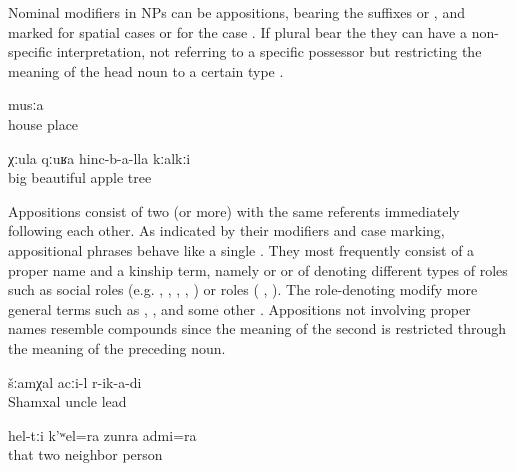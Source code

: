 Nominal modifiers in NPs can be appositions,  bearing the suffixes  or , and  marked for spatial cases  or for the  case . If plural  bear the  they can have a non-specific interpretation, not referring to a specific possessor but restricting the meaning of the head noun to a certain type . 

\begin{exe}
		\ex	\label{ex:the place in front of his house@7a}
			musːa\\
				house	place\\
		\glt	{}
	
		\ex	\label{ex:a big beautiful apple tree@7b}
		\gll	χːula	qːuʁa	hinc-b-a-lla	kːalkːi\\
			big 	beautiful	apple	tree\\
		\glt	{}
\end{exe}

Appositions consist of two (or more)  with the same referents immediately following each other. As indicated by their modifiers and case marking, appositional phrases behave like a single . They most frequently consist of a proper name and a kinship term, namely    or   or of  denoting different types of roles such as social roles (e.g.  ,  ,  ,  ,  )  or  roles ( ,  ). The role-denoting  modify more general terms such as  ,   , and some other . Appositions not involving proper names resemble compounds  since the meaning of the second  is restricted through the meaning of the preceding noun.

\begin{exe}
		\ex	\label{ex:Uncle Shamkhal guided me@8a}
		\gll	šːamχal	acːi-l	r-ik-a-di\\
			Shamxal	uncle	lead\\
		\glt	{}
	
		\ex	\label{ex:and those two neighbors@8b}
		\gll	hel-tːi	k'ʷel=ra	zunra	admi=ra\\
			that	two	neighbor	person\\
		\glt	{}
	
\end{exe}

